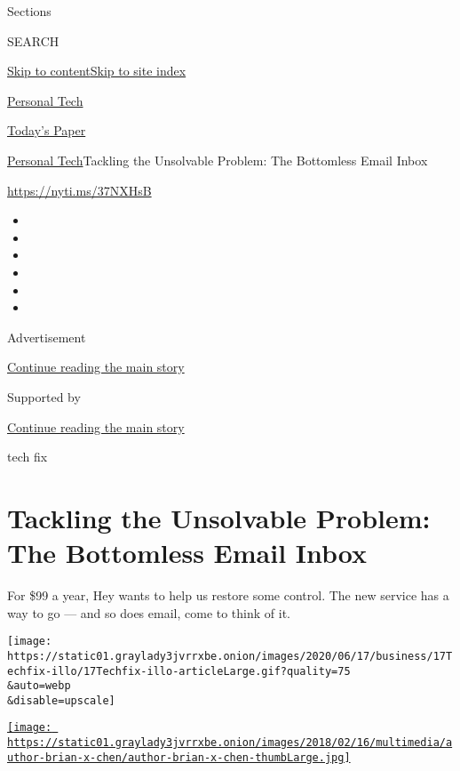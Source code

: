 Sections

SEARCH

\protect\hyperlink{site-content}{Skip to
content}\protect\hyperlink{site-index}{Skip to site index}

\href{https://www.nytimes3xbfgragh.onion/section/technology/personaltech}{Personal
Tech}

\href{https://myaccount.nytimes3xbfgragh.onion/auth/login?response_type=cookie\&client_id=vi}{}

\href{https://www.nytimes3xbfgragh.onion/section/todayspaper}{Today's
Paper}

\href{/section/technology/personaltech}{Personal Tech}\textbar{}Tackling
the Unsolvable Problem: The Bottomless Email Inbox

\url{https://nyti.ms/37NXHsB}

\begin{itemize}
\item
\item
\item
\item
\item
\item
\end{itemize}

Advertisement

\protect\hyperlink{after-top}{Continue reading the main story}

Supported by

\protect\hyperlink{after-sponsor}{Continue reading the main story}

tech fix

\hypertarget{tackling-the-unsolvable-problem-the-bottomless-email-inbox}{%
\section{Tackling the Unsolvable Problem: The Bottomless Email
Inbox}\label{tackling-the-unsolvable-problem-the-bottomless-email-inbox}}

For \$99 a year, Hey wants to help us restore some control. The new
service has a way to go --- and so does email, come to think of it.

\texttt{[image: https://static01.graylady3jvrrxbe.onion/images/2020/06/17/business/17Techfix-illo/17Techfix-illo-articleLarge.gif?quality=75\\\&auto=webp\\\&disable=upscale]}

\href{https://www.nytimes3xbfgragh.onion/by/brian-x-chen}{\texttt{[image: https://static01.graylady3jvrrxbe.onion/images/2018/02/16/multimedia/author-brian-x-chen/author-brian-x-chen-thumbLarge.jpg]}}

